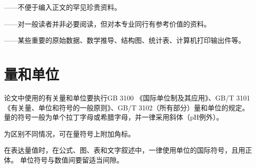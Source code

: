 ——不便于编入正文的罕见珍贵资料。

——对一般读者并非必要阅读，但对本专业同行有参考价值的资料。

——某些重要的原始数据、数学推导、结构图、统计表、计算机打印输出件等。

\section{量和单位}

论文中使用的有关量和单位要执行GB 3100 《国际单位制及其应用》、GB/T 3101《有关量、单位和符号的一般原则》、GB/T 3102（所有部分）量和单位的规定。
量的符号一般为单个拉丁字母或希腊字母，并一律采用斜体（pH例外）。

为区别不同情况，可在量符号上附加角标。

在表达量值时，在公式、图、表和文字叙述中，一律使用单位的国际符号，且用正体。
单位符号与数值间要留适当间隙。

